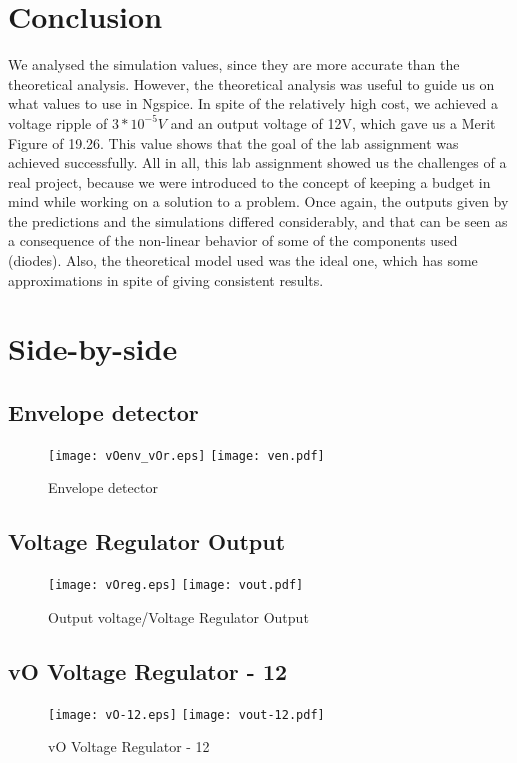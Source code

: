 \section{Conclusion}
\label{sec:conclusion}
We analysed the simulation values, since they are more accurate than the theoretical analysis. However, the theoretical analysis was useful to guide us on what values to use in Ngspice. In spite of the relatively high cost, we achieved a voltage ripple of $3*10^{-5}V$ and an output voltage of 12V, which gave us a Merit Figure of 19.26.  This value shows that the goal of the lab assignment was achieved successfully.
All in all, this lab assignment showed us the challenges of a real project, because we were introduced to the concept of keeping a budget in mind while working on a solution to a problem. Once again, the outputs given by the predictions and the simulations differed considerably, and that can be seen as a consequence of the non-linear behavior of some of the components used (diodes). Also, the theoretical model used was the ideal one, which has some approximations in spite of giving consistent results.
\clearpage

\section{Side-by-side}
\label{sec:side-by-side}

\subsection{Envelope detector}
\begin{figure}[h] \centering
\texttt{[image: vOenv\_vOr.eps]}
\texttt{[image: ven.pdf]}
\caption{Envelope detector}
\label{fig:comparison1}
\end{figure}
\FloatBarrier

\subsection{Voltage Regulator Output}
\begin{figure}[h] \centering
\texttt{[image: vOreg.eps]}
\texttt{[image: vout.pdf]}
\caption{Output voltage/Voltage Regulator Output}
\label{fig:comparison2}
\end{figure}
\FloatBarrier

\subsection{vO Voltage Regulator - 12}
\begin{figure}[h] \centering
\texttt{[image: vO-12.eps]}
\texttt{[image: vout-12.pdf]}
\caption{vO Voltage Regulator - 12}
\label{fig:comparison3}
\end{figure}
\FloatBarrier
